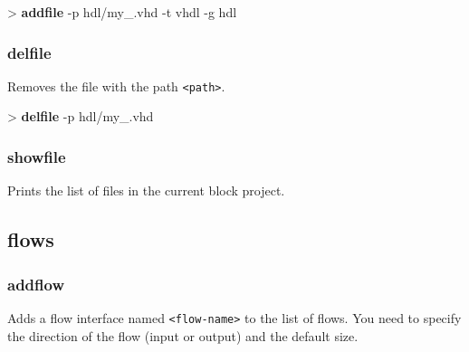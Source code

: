\documentclass[10pt,a4paper]{article}
\begin{document}
\begin{sampletitle}
> \textbf{\tool{} addfile} -p hdl/my\_\kind{}.vhd -t vhdl -g hdl
\end{sampletitle}


\subsubsection{delfile}
\label{subsec:delfile}

Removes the file with the path \texttt{<path>}.\\


\begin{sampletitle}
> \textbf{\tool{} delfile} -p hdl/my\_\kind{}.vhd
\end{sampletitle}


\subsubsection{showfile}
\label{subsec:showfile}

Prints the list of files in the current block project.

\subsection{flows}
\subsubsection{addflow}
\label{subsec:addflow}

Adds a flow interface named \texttt{<flow-name>} to the list of flows. You need to specify the direction of the flow (input or output) and the default size.\\
\end{document}
